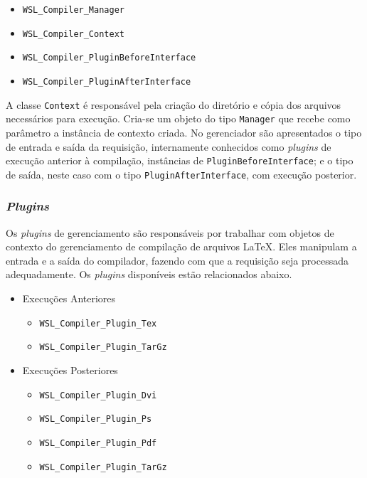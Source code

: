 \documentclass{article}
\begin{document}
\begin{itemize}
    \item \texttt{WSL\_Compiler\_Manager}
    \item \texttt{WSL\_Compiler\_Context}
    \item \texttt{WSL\_Compiler\_PluginBeforeInterface}
    \item \texttt{WSL\_Compiler\_PluginAfterInterface}
\end{itemize}

A classe \texttt{Context} é responsável pela criação do diretório e cópia dos
arquivos necessários para execução. Cria-se um objeto do tipo \texttt{Manager}
que recebe como parâmetro a instância de contexto criada. No gerenciador são
apresentados o tipo de entrada e saída da requisição, internamente conhecidos
como \emph{plugins} de execução anterior à compilação, instâncias de
\texttt{PluginBeforeInterface}; e o tipo de saída, neste caso com o tipo
\texttt{PluginAfterInterface}, com execução posterior.

\subsubsection{\emph{Plugins}}

Os \emph{plugins} de gerenciamento são responsáveis por trabalhar com objetos de
contexto do gerenciamento de compilação de arquivos \LaTeX{}. Eles manipulam a
entrada e a saída do compilador, fazendo com que a requisição seja processada
adequadamente. Os \emph{plugins} disponíveis estão relacionados abaixo.

\begin{itemize}
    \item Execuções Anteriores
    \begin{itemize}
        \item \texttt{WSL\_Compiler\_Plugin\_Tex}
        \item \texttt{WSL\_Compiler\_Plugin\_TarGz}
    \end{itemize}
    \item Execuções Posteriores
    \begin{itemize}
        \item \texttt{WSL\_Compiler\_Plugin\_Dvi}
        \item \texttt{WSL\_Compiler\_Plugin\_Ps}
        \item \texttt{WSL\_Compiler\_Plugin\_Pdf}
        \item \texttt{WSL\_Compiler\_Plugin\_TarGz}
    \end{itemize}
\end{itemize}
\end{document}

